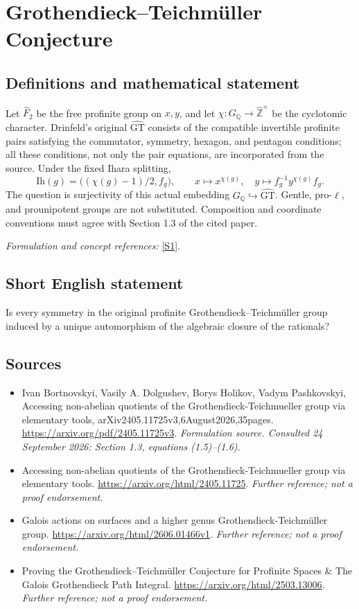 \documentclass[11pt]{article}
\begin{document}
\section*{\texorpdfstring{Grothendieck–Teichmüller Conjecture}{Grothendieck–Teichmüller Conjecture}}\label{30006722}
\subsection{Definitions and mathematical statement}
Let $\widehat F_2$ be the free profinite group on $x,y$, and let $\chi:G_{{\mathbb{Q}}}\to\widehat{{\mathbb{Z}}}^\times$ be the cyclotomic character. Drinfeld's original $\widehat{\mathrm{GT}}$ consists of the compatible invertible profinite pairs satisfying the commutator, symmetry, hexagon, and pentagon conditions; all these conditions, not only the pair equations, are incorporated from the source. Under the fixed Ihara splitting,
\[
 \mathrm{Ih}(g)=\bigl((\chi(g)-1)/2,f_g\bigr),\qquad
 x\mapsto x^{\chi(g)},\quad y\mapsto f_g^{-1}y^{\chi(g)}f_g.
\]
The question is surjectivity of this actual embedding $G_{{\mathbb{Q}}}\hookrightarrow\widehat{\mathrm{GT}}$. Gentle, pro-$\ell$, and prounipotent groups are not substituted. Composition and coordinate conventions must agree with Section 1.3 of the cited paper.
\par\smallskip\textit{Formulation and concept references:} \href{https://arxiv.org/pdf/2405.11725v3}{[S1]}.

\subsection{Short English statement}
Is every symmetry in the original profinite Grothendieck--Teichmüller group induced by a unique automorphism of the algebraic closure of the rationals?
\subsection{Sources}
\begin{itemize}
\item[S1]Ivan Bortnovskyi, Vasily A. Dolgushev, Borys Holikov, Vadym Pashkovskyi, Accessing non-abelian quotients of the Grothendieck-Teichmueller group via elementary tools, arXiv2405.11725v3,6August2026,35pages.
\url{https://arxiv.org/pdf/2405.11725v3}.
\textit{Formulation source. Consulted 24 September 2026: Section 1.3, equations (1.5)--(1.6).}
\item[S2]Accessing non-abelian quotients of the Grothendieck-Teichmueller group via elementary tools.
\url{https://arxiv.org/html/2405.11725}.
\textit{Further reference; not a proof endorsement.}
\item[S3]Galois actions on surfaces and a higher genus Grothendieck-Teichmüller group.
\url{https://arxiv.org/html/2606.01466v1}.
\textit{Further reference; not a proof endorsement.}
\item[S4]Proving the Grothendieck–Teichmüller Conjecture for Profinite Spaces \& The Galois Grothendieck Path Integral.
\url{https://arxiv.org/html/2503.13006}.
\textit{Further reference; not a proof endorsement.}
\end{itemize}
\end{document}
